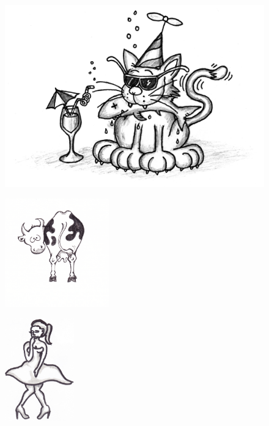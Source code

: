 
\begin{figure}[!b]
\begin{center}
\includegraphics[scale=.8]{../bilder/sillis.png} 
\end{center}
\end{figure}
\clearpage

\begin{figure}[!b]
\begin{center}
\includegraphics[width=4.5cm]{../bilder/ko.jpg} 
\end{center}
\end{figure}
\clearpage


\clearpage

\clearpage

\clearpage

\begin{figure}[!b]
\begin{center}
\includegraphics[width=3cm]{../bilder/kissnodigflicka.jpg} 
\end{center}
\end{figure}
